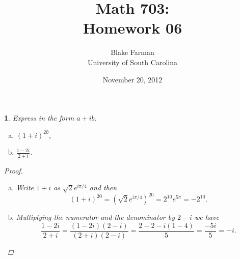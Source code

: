 \documentclass[12pt]{amsart}
\author{Blake Farman\\University of South Carolina}
\title{Math 703:\\Homework 06}
\date{November 20, 2012}
\begin{document}
\maketitle

\newcommand{\Z}{\mathbb{Z}}
\newcommand{\R}{\mathbb{R}}
\newcommand{\Q}{\mathbb{Q}}
\newcommand{\C}{\mathbb{C}}
\newcommand{\F}{\mathbb{F}}
\newcommand{\N}{\mathbb{N}}
\newcommand{\uhp}{\mathfrak{h}}

\newcommand{\ord}{\operatorname{ord}}
\newcommand{\Det}{\operatorname{Det}}
\newcommand{\Gal}{\operatorname{Gal}}
\newcommand{\Inn}[1]{\operatorname{Inn}\left(#1\right)}
\newcommand{\Aut}[1]{\operatorname{Aut}\left(#1\right)}
\newcommand{\real}[1]{\operatorname{\mathfrak{Re}}\left(#1\right)}
\newcommand{\imag}[1]{\operatorname{\mathfrak{Im}}\left(#1\right)}
\newcommand{\Syl}[2]{\operatorname{Syl}_{#1}\left(#2\right)}
\newcommand{\SL}[2]{\operatorname{SL}_#1\left(#2\right)}
\newcommand{\GL}[2]{\operatorname{GL}_#1\left(#2\right)}
\newcommand{\M}[2]{\operatorname{M}_#1\left(#2\right)}
\newcommand{\PSL}[2]{\operatorname{PSL}_#1\left(#2\right)}
\newcommand{\Mat}[2]{\operatorname{Mat}_{#1}\left(#2\right)}
\providecommand{\norm}[1]{\lVert#1\rVert}
\newcommand{\dist}[2]{\operatorname{dist}\left(#1,#2\right)}
\newcommand{\cntr}[1]{\mathbf{Z}\left(#1\right)}
\newcommand{\abs}[1]{\left| #1 \right|}
\newcommand{\orbit}[1]{\mathcal{O}_{#1}}
\newcommand{\card}[1]{\operatorname{card}#1}
\newcommand{\Log}[1]{\operatorname{Log}\left(#1\right)}
\newcommand{\Arg}[1]{\operatorname{Arg}\left(#1\right)}

\renewcommand{\qedsymbol}{\(\blacksquare\)}
\renewcommand{\epsilon}{\varepsilon}

\newtheorem{thm}{}
\setcounter{thm}{20}
\newtheorem{ex}{}[thm]
\newtheorem{lem}{Lemma}
\theoremstyle{definition}
\newtheorem{defn}{Definition}

\begin{thm}
  Express in the form $a + ib$.
  
  \begin{enumerate}[(a)]
  \item
    $(1 + i)^{20}$,
  \item
    $\frac{1 - 2i}{2 + i}$.
  \end{enumerate}
  
  \begin{proof}
    \begin{enumerate}[(a)]
      \item
        Write $1 + i$ as $\sqrt{2}e^{i\pi/4}$ and then 
        $$(1 + i)^{20} = (\sqrt{2}e^{i\pi/4})^{20} = 2^{10}e^{5\pi} = -2^{10}.$$
      \item
        Multiplying the numerator and the denominator by $2 - i$ we have
        $$\frac{1 - 2i}{2 + i} = \frac{(1 - 2i)(2 - i)}{(2 + i)(2 - i)} = \frac{2 - 2 - i(1 - 4)}{5} = \frac{-5i}{5} = -i.$$
    \end{enumerate}
  \end{proof}
\end{thm}
\end{document}
